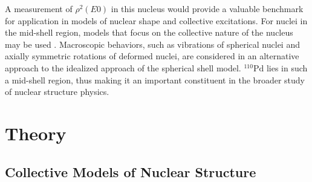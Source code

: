 \documentclass[twocolumn,preprintnumbers,amsmath,amssymb]{revtex4}
\begin{document}
A measurement of $\rho^2(E0)$ in this nucleus would provide a valuable benchmark for application in models of nuclear shape and collective excitations. For nuclei in the mid-shell region, models that focus on the collective nature of the nucleus may be used \cite{evitts_4}. Macroscopic behaviors, such as vibrations of spherical nuclei and axially symmetric rotations of deformed nuclei, are considered in an alternative approach to the idealized approach of the spherical shell model. $^{110}\mathrm{Pd}$ lies in such a mid-shell region, thus making it an important constituent in the broader study of nuclear structure physics. 

\section{Theory}

\subsection{Collective Models of Nuclear Structure}
\end{document}
